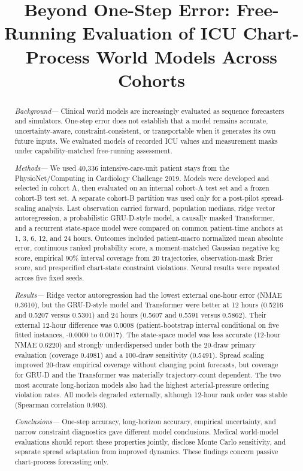 \documentclass[conference]{IEEEtran}
\title{Beyond One-Step Error: Free-Running Evaluation of ICU Chart-Process World Models Across Cohorts}
\author{
\IEEEauthorblockN{Anonymous Authors}
\IEEEauthorblockA{Affiliations withheld for anonymous review}
}
\begin{document}
\maketitle

\begin{abstract}
\textit{Background---} Clinical world models are increasingly evaluated as sequence forecasters and simulators. One-step error does not establish that a model remains accurate, uncertainty-aware, constraint-consistent, or transportable when it generates its own future inputs. We evaluated models of recorded ICU values and measurement masks under capability-matched free-running assessment.

\textit{Methods---} We used 40,336 intensive-care-unit patient stays from the PhysioNet/Computing in Cardiology Challenge 2019. Models were developed and selected in cohort A, then evaluated on an internal cohort-A test set and a frozen cohort-B test set. A separate cohort-B partition was used only for a post-pilot spread-scaling analysis. Last observation carried forward, population medians, ridge vector autoregression, a probabilistic GRU-D-style model, a causally masked Transformer, and a recurrent state-space model were compared on common patient-time anchors at 1, 3, 6, 12, and 24 hours. Outcomes included patient-macro normalized mean absolute error, continuous ranked probability score, a moment-matched Gaussian negative log score, empirical 90\% interval coverage from 20 trajectories, observation-mask Brier score, and prespecified chart-state constraint violations. Neural results were repeated across five fixed seeds.

\textit{Results---} Ridge vector autoregression had the lowest external one-hour error (NMAE 0.3610), but the GRU-D-style model and Transformer were better at 12 hours (0.5216 and 0.5207 versus 0.5301) and 24 hours (0.5607 and 0.5591 versus 0.5862). Their external 12-hour difference was 0.0008 (patient-bootstrap interval conditional on five fitted instances, -0.0000 to 0.0017). The state-space model was less accurate (12-hour NMAE 0.6220) and strongly underdispersed under both the 20-draw primary evaluation (coverage 0.4981) and a 100-draw sensitivity (0.5491). Spread scaling improved 20-draw empirical coverage without changing point forecasts, but coverage for GRU-D and the Transformer was materially trajectory-count dependent. The two most accurate long-horizon models also had the highest arterial-pressure ordering violation rates. All models degraded externally, although 12-hour rank order was stable (Spearman correlation 0.993).

\textit{Conclusions---} One-step accuracy, long-horizon accuracy, empirical uncertainty, and narrow constraint diagnostics gave different model conclusions. Medical world-model evaluations should report these properties jointly, disclose Monte Carlo sensitivity, and separate spread adaptation from improved dynamics. These findings concern passive chart-process forecasting only.
\end{abstract}
\end{document}

